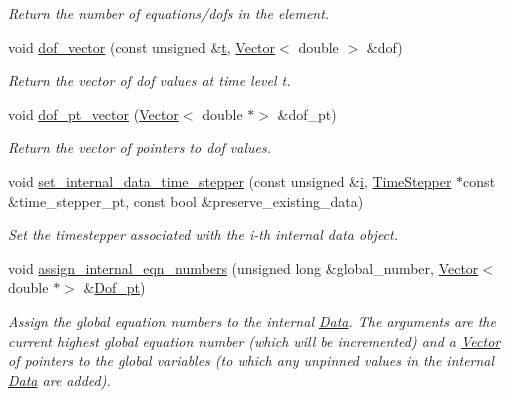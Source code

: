 \begin{DoxyCompactItemize}
\begin{DoxyCompactList}\small\item\em Return the number of equations/dofs in the element. \end{DoxyCompactList}\item 
void \hyperlink{classoomph_1_1GeneralisedElement_a14f3cf0fbf4f2f7ae45cac6beef398c7}{dof\+\_\+vector} (const unsigned \&\hyperlink{cfortran_8h_af6f0bd3dc13317f895c91323c25c2b8f}{t}, \hyperlink{classoomph_1_1Vector}{Vector}$<$ double $>$ \&dof)
\begin{DoxyCompactList}\small\item\em Return the vector of dof values at time level t. \end{DoxyCompactList}\item 
void \hyperlink{classoomph_1_1GeneralisedElement_ae30cdd0cb8f2eb4de856cd202762b19e}{dof\+\_\+pt\+\_\+vector} (\hyperlink{classoomph_1_1Vector}{Vector}$<$ double $\ast$$>$ \&dof\+\_\+pt)
\begin{DoxyCompactList}\small\item\em Return the vector of pointers to dof values. \end{DoxyCompactList}\item 
void \hyperlink{classoomph_1_1GeneralisedElement_a17a0ab600e97a50352a5ef696907a625}{set\+\_\+internal\+\_\+data\+\_\+time\+\_\+stepper} (const unsigned \&\hyperlink{cfortran_8h_adb50e893b86b3e55e751a42eab3cba82}{i}, \hyperlink{classoomph_1_1TimeStepper}{Time\+Stepper} $\ast$const \&time\+\_\+stepper\+\_\+pt, const bool \&preserve\+\_\+existing\+\_\+data)
\begin{DoxyCompactList}\small\item\em Set the timestepper associated with the i-\/th internal data object. \end{DoxyCompactList}\item 
void \hyperlink{classoomph_1_1GeneralisedElement_aab4797832b06c6ef7986582faa52ece6}{assign\+\_\+internal\+\_\+eqn\+\_\+numbers} (unsigned long \&global\+\_\+number, \hyperlink{classoomph_1_1Vector}{Vector}$<$ double $\ast$$>$ \&\hyperlink{classoomph_1_1GeneralisedElement_ad227e5660854a3bc84a5d18eeabb457c}{Dof\+\_\+pt})
\begin{DoxyCompactList}\small\item\em Assign the global equation numbers to the internal \hyperlink{classoomph_1_1Data}{Data}. The arguments are the current highest global equation number (which will be incremented) and a \hyperlink{classoomph_1_1Vector}{Vector} of pointers to the global variables (to which any unpinned values in the internal \hyperlink{classoomph_1_1Data}{Data} are added). \end{DoxyCompactList}\item 

\end{DoxyCompactItemize}
